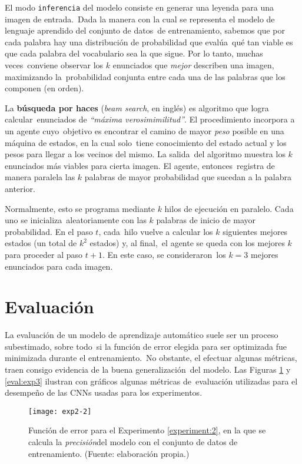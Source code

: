 \noindent
El modo \verb+inferencia+ del modelo consiste en generar una leyenda para una imagen de entrada.\
Dada la manera con la cual se representa el modelo de lenguaje aprendido del conjunto de datos\
de entrenamiento, sabemos que por cada palabra hay una distribución de probabilidad que evalúa\
qué tan viable es que cada palabra del vocabulario sea la que sigue. Por lo tanto, muchas veces\
conviene observar los $k$ enunciados que \emph{mejor} describen una imagen, maximizando la\
probabilidad conjunta entre cada una de las palabras que los componen (en orden).\par
La \textbf{búsqueda por haces} (\emph{beam search}, en inglés) es algoritmo que logra calcular\
enunciados de \emph{``máxima verosimimilitud''}. El procedimiento incorpora a un agente cuyo\
objetivo es encontrar el camino de mayor \emph{peso} posible en una máquina de estados, en la cual solo\
tiene conocimiento del estado actual y los pesos para llegar a los vecinos del mismo. La salida\
del algoritmo muestra los $k$ enunciados más viables para cierta imagen. El agente, entonces\
registra de manera paralela las $k$ palabras de mayor probabilidad que sucedan a la palabra anterior.\par
Normalmente, esto se programa mediante $k$ hilos de ejecución en paralelo. Cada uno se inicializa\
aleatoriamente con las $k$ palabras de inicio de mayor probabilidad. En el paso $t$, cada\
hilo vuelve a calcular los $k$ siguientes mejores estados (un total de $k^2$ estados) y, al final,\
el agente se queda con los mejores $k$ para proceder al paso $t+1$. En este caso, se consideraron\
los $k=3$ mejores enunciados para cada imagen.

\section{Evaluación} \label{sec:metrics}

\noindent
La evaluación de un modelo de aprendizaje automático suele ser un proceso subestimado, sobre todo\
si la función de error elegida para ser optimizada fue minimizada durante el entrenamiento.\
No obstante, el efectuar algunas métricas, traen consigo evidencia de la buena generalización\
del modelo. Las Figuras \ref{eval:exp2} y \ref{eval:exp3} ilustran con gráficos algunas métricas de\
evaluación utilizadas para el desempeño de las CNNs usadas para los experimentos.

\begin{figure}[H]
  \texttt{[image: exp2-2]}
  \caption[Nota al pie]{
    Función de error para el Experimento \ref{experiment:2}, en la que se
    calcula la \emph{precisión}\footnotemark del modelo con el conjunto de
    datos de entrenamiento.
    (Fuente: elaboración propia.)
  }
  \label{eval:exp2}
\end{figure}

